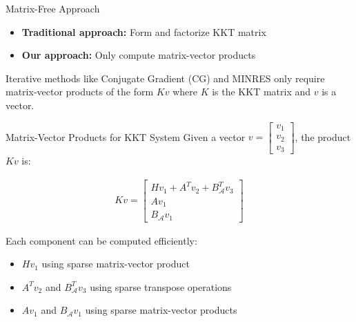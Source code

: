 \documentclass{beamer}
\begin{document}
\begin{frame}{Matrix-Free Approach}
    \begin{itemize}
        \item \textbf{Traditional approach:} Form and factorize KKT matrix
        \item \textbf{Our approach:} Only compute matrix-vector products
    \end{itemize}
    
    \begin{theorem}
        Iterative methods like Conjugate Gradient (CG) and MINRES only require matrix-vector products of the form $Kv$ where $K$ is the KKT matrix and $v$ is a vector.
    \end{theorem}
\end{frame}

\begin{frame}{Matrix-Vector Products for KKT System}
    Given a vector $v = \begin{bmatrix} v_1 \\ v_2 \\ v_3 \end{bmatrix}$, the product $Kv$ is:
    
    \begin{align}
        Kv = 
        \begin{bmatrix}
            Hv_1 + A^Tv_2 + B_{\mathcal{A}}^Tv_3 \\
            Av_1 \\
            B_{\mathcal{A}}v_1
        \end{bmatrix}
    \end{align}
    
    Each component can be computed efficiently:
    \begin{itemize}
        \item $Hv_1$ using sparse matrix-vector product
        \item $A^Tv_2$ and $B_{\mathcal{A}}^Tv_3$ using sparse transpose operations
        \item $Av_1$ and $B_{\mathcal{A}}v_1$ using sparse matrix-vector products
    \end{itemize}
\end{frame}
\end{document}
